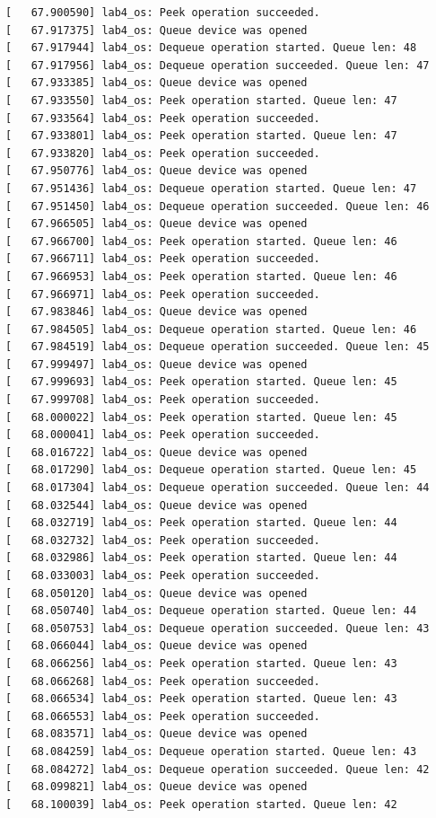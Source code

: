 \documentclass[a4paper,14pt]{extarticle}
\begin{document}
\begin{verbatim}
[   67.900590] lab4_os: Peek operation succeeded.
[   67.917375] lab4_os: Queue device was opened
[   67.917944] lab4_os: Dequeue operation started. Queue len: 48
[   67.917956] lab4_os: Dequeue operation succeeded. Queue len: 47
[   67.933385] lab4_os: Queue device was opened
[   67.933550] lab4_os: Peek operation started. Queue len: 47
[   67.933564] lab4_os: Peek operation succeeded.
[   67.933801] lab4_os: Peek operation started. Queue len: 47
[   67.933820] lab4_os: Peek operation succeeded.
[   67.950776] lab4_os: Queue device was opened
[   67.951436] lab4_os: Dequeue operation started. Queue len: 47
[   67.951450] lab4_os: Dequeue operation succeeded. Queue len: 46
[   67.966505] lab4_os: Queue device was opened
[   67.966700] lab4_os: Peek operation started. Queue len: 46
[   67.966711] lab4_os: Peek operation succeeded.
[   67.966953] lab4_os: Peek operation started. Queue len: 46
[   67.966971] lab4_os: Peek operation succeeded.
[   67.983846] lab4_os: Queue device was opened
[   67.984505] lab4_os: Dequeue operation started. Queue len: 46
[   67.984519] lab4_os: Dequeue operation succeeded. Queue len: 45
[   67.999497] lab4_os: Queue device was opened
[   67.999693] lab4_os: Peek operation started. Queue len: 45
[   67.999708] lab4_os: Peek operation succeeded.
[   68.000022] lab4_os: Peek operation started. Queue len: 45
[   68.000041] lab4_os: Peek operation succeeded.
[   68.016722] lab4_os: Queue device was opened
[   68.017290] lab4_os: Dequeue operation started. Queue len: 45
[   68.017304] lab4_os: Dequeue operation succeeded. Queue len: 44
[   68.032544] lab4_os: Queue device was opened
[   68.032719] lab4_os: Peek operation started. Queue len: 44
[   68.032732] lab4_os: Peek operation succeeded.
[   68.032986] lab4_os: Peek operation started. Queue len: 44
[   68.033003] lab4_os: Peek operation succeeded.
[   68.050120] lab4_os: Queue device was opened
[   68.050740] lab4_os: Dequeue operation started. Queue len: 44
[   68.050753] lab4_os: Dequeue operation succeeded. Queue len: 43
[   68.066044] lab4_os: Queue device was opened
[   68.066256] lab4_os: Peek operation started. Queue len: 43
[   68.066268] lab4_os: Peek operation succeeded.
[   68.066534] lab4_os: Peek operation started. Queue len: 43
[   68.066553] lab4_os: Peek operation succeeded.
[   68.083571] lab4_os: Queue device was opened
[   68.084259] lab4_os: Dequeue operation started. Queue len: 43
[   68.084272] lab4_os: Dequeue operation succeeded. Queue len: 42
[   68.099821] lab4_os: Queue device was opened
[   68.100039] lab4_os: Peek operation started. Queue len: 42

\end{verbatim}
\end{document}
